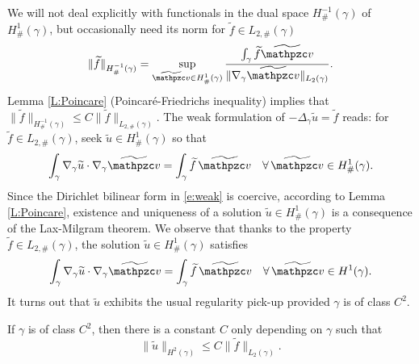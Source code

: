 %
%
We will not deal explicitly with functionals in the dual space $H^{-1}_\#(\gamma)$
of $H^1_\#(\gamma)$, but occasionally need its norm for $\widetilde f\in L_{2,\#}(\gamma)$
%
\begin{equation}\label{dual-norm}
\|\widetilde f\|_{H^{-1}_\#(\gamma)} = \sup_{\widetilde \tv\in H^1_\#(\gamma)}
\frac{\int_\gamma \widetilde f \widetilde \tv}{\|\nabla_\gamma \widetilde \tv\|_{L_2(\gamma)}}.
\end{equation}
%
Lemma \ref{L:Poincare} (Poincar\'e-Friedrichs inequality) implies that $\|\widetilde f\|_{H^{-1}_\#(\gamma)} \le C \|\widetilde f\|_{L_{2,\#}(\gamma)}$.
The weak formulation of $-\Delta_\gamma \widetilde u = \widetilde f$ reads:
for $\widetilde f \in L_{2,\#}(\gamma)$, seek $\widetilde u \in H^1_\#(\gamma)$ so that
%
\begin{equation}\label{e:weak}
 \int_{\gamma} \nabla_{\gamma}\widetilde u \cdot \nabla_{\gamma}\widetilde \tv 
=  \int_\gamma \widetilde f \,  \widetilde\tv 
\quad \forall \,  \widetilde\tv \in H^1_\#(\gamma).  
\end{equation}
%
Since the Dirichlet bilinear form in \eqref{e:weak} is coercive, according
to Lemma \ref{L:Poincare}, 
existence and uniqueness of a solution $\widetilde u\in H^1_\#(\gamma)$ is a consequence of
the Lax-Milgram theorem.
 We observe that thanks to the property $\widetilde f \in L_{2,\#}(\gamma)$, the solution $\widetilde u \in H^1_\#(\gamma)$ satisfies
\begin{equation}\label{e:weak_relax}
 \int_{\gamma} \nabla_{\gamma} \widetilde u \cdot \nabla_{\gamma} \widetilde \tv 
=  \int_\gamma \widetilde f \, \widetilde \tv 
\quad \forall \, \widetilde \tv \in H^1(\gamma).
\end{equation}
%
It turns out that $\widetilde u$ exhibits the usual regularity pick-up provided $\gamma$ is
of class $C^2$.
%
\begin{lemma}[regularity]\label{L:regularity}
  If $\gamma$ is of class $C^2$, then there is a constant $C$ only depending on
  $\gamma$ such that
%  
\begin{equation}\label{regularity}
\|\widetilde u\|_{H^2(\gamma)} \le C \|\widetilde f\|_{L_2(\gamma)}.  
\end{equation}
\end{lemma}
%
